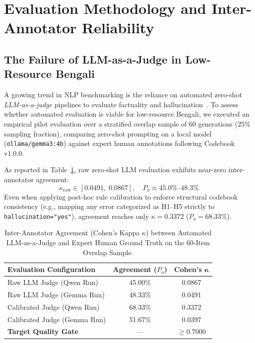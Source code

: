 \section{Evaluation Methodology and Inter-Annotator Reliability}
\label{sec:evaluation_reliability}

\subsection{The Failure of LLM-as-a-Judge in Low-Resource Bengali}
A growing trend in NLP benchmarking is the reliance on automated zero-shot \emph{LLM-as-a-judge} pipelines to evaluate factuality and hallucination~\citep{li2023halueval}. To assess whether automated evaluation is viable for low-resource Bengali, we executed an empirical pilot evaluation over a stratified overlap sample of 60 generations ($25\%$ sampling fraction), comparing zero-shot prompting on a local model (\texttt{ollama/gemma3:4b}) against expert human annotations following Codebook v1.0.0.

As reported in Table~\ref{tab:iaa_reliability}, raw zero-shot LLM evaluation exhibits near-zero inter-annotator agreement:
\begin{equation}
    \kappa_{\text{raw}} \in [0.0491, \; 0.0867], \quad P_o \approx 45.0\% \text{--} 48.3\%
\end{equation}
Even when applying post-hoc rule calibration to enforce structural codebook consistency (e.g., mapping any error categorized as H1--H5 strictly to \texttt{hallucination="yes"}), agreement reaches only $\kappa = 0.3372$ ($P_o = 68.33\%$).

\begin{table}[t]
\centering
\footnotesize
\setlength{\tabcolsep}{3pt}
\begin{tabular}{lcc}
\toprule
\textbf{Evaluation Configuration} & \textbf{Agreement ($P_o$)} & \textbf{Cohen's $\mathbf{\kappa}$} \\
\midrule
Raw LLM Judge (Qwen Run)     & 45.00\% & 0.0867 \\
Raw LLM Judge (Gemma Run)    & 48.33\% & 0.0491 \\
Calibrated Judge (Qwen Run)  & 68.33\% & 0.3372 \\
Calibrated Judge (Gemma Run) & 51.67\% & 0.0397 \\
\midrule
\textbf{Target Quality Gate} & --- & $\ge \mathbf{0.7000}$ \\
\bottomrule
\end{tabular}
\caption{Inter-Annotator Agreement (Cohen's Kappa $\kappa$) between Automated LLM-as-a-Judge and Expert Human Ground Truth on the 60-Item Overlap Sample.}
\label{tab:iaa_reliability}
\end{table}

